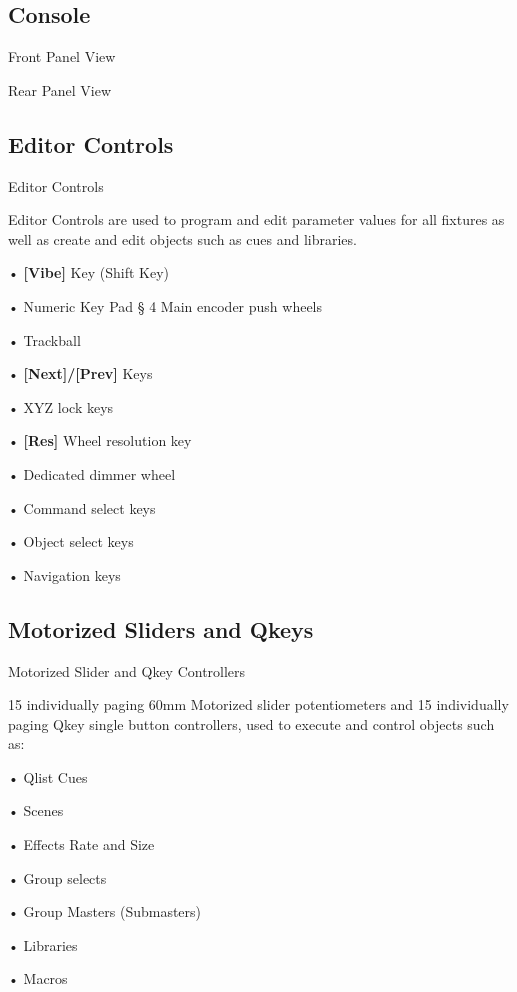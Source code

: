 \documentclass[
]{article}
\begin{document}
\hypertarget{console}{%
\subsection{Console}\label{console}}

Front Panel View

Rear Panel View

\hypertarget{editor-controls}{%
\subsection{Editor Controls}\label{editor-controls}}

Editor Controls

Editor Controls are used to program and edit parameter values for all fixtures as well as create and edit objects such as cues and libraries.

• \textbf{{[}Vibe{]}} Key (Shift Key)

• Numeric Key Pad § 4 Main encoder push wheels

• Trackball

• \textbf{{[}Next{]}/{[}Prev{]}} Keys

• XYZ lock keys

• \textbf{{[}Res{]}} Wheel resolution key

• Dedicated dimmer wheel

• Command select keys

• Object select keys

• {Navigation keys}

\hypertarget{motorized-sliders-and-qkeys}{%
\subsection{Motorized Sliders and Qkeys}\label{motorized-sliders-and-qkeys}}

Motorized Slider and Qkey Controllers

15 individually paging 60mm Motorized slider potentiometers and 15 individually paging Qkey single button controllers, used to execute and control objects such as:

• Qlist Cues

• Scenes

• Effects Rate and Size

• Group selects

• Group Masters (Submasters)

• Libraries

• {Macros}
\end{document}
